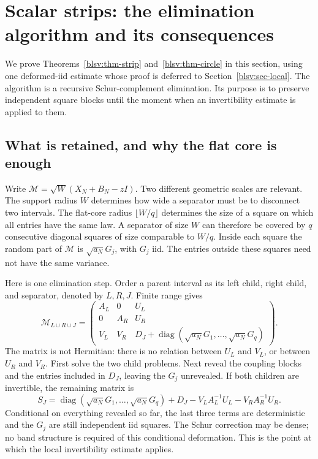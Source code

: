 \documentclass[11pt,reqno]{amsart}
\numberwithin{equation}{section}
\theoremstyle{plain}
\theoremstyle{definition}
\theoremstyle{remark}
\begin{document}
\section{Scalar strips: the elimination algorithm and its consequences}
\label{blsv:sec-tree}

We prove Theorems~\ref{blsv:thm-strip} and~\ref{blsv:thm-circle} in this
section, using one deformed-iid estimate whose proof is deferred to
Section~\ref{blsv:sec-local}. The algorithm is a recursive Schur-complement
elimination. Its purpose is to preserve independent square blocks until
the moment when an invertibility estimate is applied to them.

\subsection{What is retained, and why the flat core is enough}
\label{blsv:subsec-algorithm}
Write $\mathcal M=\sqrt W(X_N+B_N-zI)$. Two different geometric scales
are relevant. The support radius $W$ determines how wide a separator
must be to disconnect two intervals. The flat-core radius
$\lfloor W/q\rfloor$ determines the size of a square on which all entries
have the same law. A separator of size $W$ can therefore be covered by
$q$ consecutive diagonal squares of size comparable to $W/q$.
Inside each square the random part of $\mathcal M$ is
$\sqrt{a_N}G_j$, with $G_j$ iid. The entries outside these squares need
not have the same variance.

Here is one elimination step. Order a parent interval as its left child,
right child, and separator, denoted by $L,R,J$. Finite range gives
\[
 \mathcal M_{L\cup R\cup J}=
 \begin{pmatrix}
 A_L&0&U_L\\
 0&A_R&U_R\\
 V_L&V_R&D_J+\operatorname{diag}(\sqrt{a_N}G_1,\ldots,
                                  \sqrt{a_N}G_q)
 \end{pmatrix}.
\]
The matrix is not Hermitian: there is no relation between $U_L$ and
$V_L$, or between $U_R$ and $V_R$. First solve the two child problems.
Next reveal the coupling blocks and the entries included in $D_J$,
leaving the $G_j$ unrevealed. If both children are invertible, the
remaining matrix is
\[
 S_J=\operatorname{diag}(\sqrt{a_N}G_1,\ldots,\sqrt{a_N}G_q)
       +D_J-V_LA_L^{-1}U_L-V_RA_R^{-1}U_R.
\]
Conditional on everything revealed so far, the last three terms are
deterministic and the $G_j$ are still independent iid squares. The
Schur correction may be dense; no band structure is required of this
conditional deformation. This is the point at which the local
invertibility estimate applies.
\end{document}
